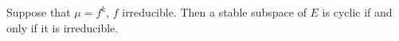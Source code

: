 Suppose that $\mu = f^k$, $f$ irreducible. Then a stable subspace of $E$ is cyclic if and only if it is irreducible.
